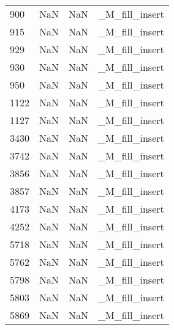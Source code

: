 \begin{tabular}{llll}
900  &                   NaN &                        NaN &                            \_M\_fill\_insert \\
915  &                   NaN &                        NaN &                            \_M\_fill\_insert \\
929  &                   NaN &                        NaN &                            \_M\_fill\_insert \\
930  &                   NaN &                        NaN &                            \_M\_fill\_insert \\
950  &                   NaN &                        NaN &                            \_M\_fill\_insert \\
1122 &                   NaN &                        NaN &                            \_M\_fill\_insert \\
1127 &                   NaN &                        NaN &                            \_M\_fill\_insert \\
3430 &                   NaN &                        NaN &                            \_M\_fill\_insert \\
3742 &                   NaN &                        NaN &                            \_M\_fill\_insert \\
3856 &                   NaN &                        NaN &                            \_M\_fill\_insert \\
3857 &                   NaN &                        NaN &                            \_M\_fill\_insert \\
4173 &                   NaN &                        NaN &                            \_M\_fill\_insert \\
4252 &                   NaN &                        NaN &                            \_M\_fill\_insert \\
5718 &                   NaN &                        NaN &                            \_M\_fill\_insert \\
5762 &                   NaN &                        NaN &                            \_M\_fill\_insert \\
5798 &                   NaN &                        NaN &                            \_M\_fill\_insert \\
5803 &                   NaN &                        NaN &                            \_M\_fill\_insert \\
5869 &                   NaN &                        NaN &                            \_M\_fill\_insert \\

\end{tabular}
